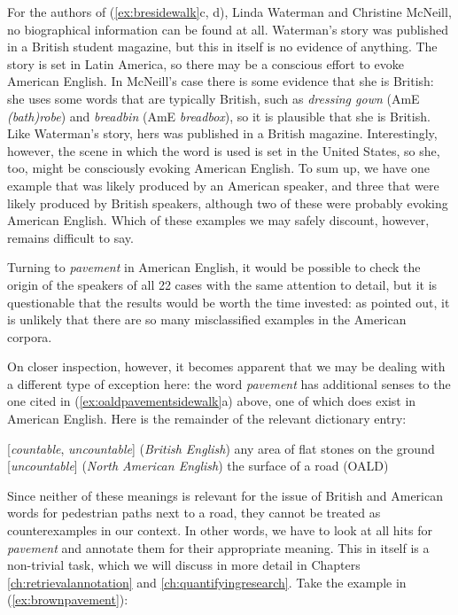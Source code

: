 For the authors of (\ref{ex:bresidewalk}c, d), Linda Waterman and Christine McNeill, no biographical information can be found at all. Waterman's story was published in a British student magazine, but this in itself is no evidence of anything. The story is set in Latin America, so there may be a conscious effort to evoke American English. In McNeill's case there is some evidence that she is British: she uses some words that are typically British, such as \textit{dressing gown} (AmE \textit{(bath)robe}) and \textit{breadbin} (AmE \textit{breadbox}), so it is plausible that she is British. Like Waterman's story, hers was published in a British magazine. Interestingly, however, the scene in which the word is used is set in the United States, so she, too, might be consciously evoking American English. To sum up, we have one example that was likely produced by an American speaker, and three that were likely produced by British speakers, although two of these were probably evoking American English. Which of these examples we may safely discount, however, remains difficult to say.

Turning to \textit{pavement} in American English, it would be possible to check the origin of the speakers of all 22 cases with the same attention to detail, but it is questionable that the results would be worth the time invested: as pointed out, it is unlikely that there are so many misclassified examples in the American corpora.

On closer inspection, however, it becomes apparent that we may be dealing with a different type of exception here: the word \textit{pavement} has additional senses to the one cited in (\ref{ex:oaldpavementsidewalk}a) above, one of which does exist in American English. Here is the remainder of the relevant dictionary entry:

\begin{exe}
\ex
\begin{xlist}
\label{ex:restoaldpavement}
 [\textit{countable}, \textit{uncountable}] (\textit{British English}) any area of flat stones on the ground
 [\textit{uncountable}] (\textit{North American English}) the surface of a road (OALD)
\end{xlist}
\end{exe}

Since neither of these meanings is relevant for the issue of British and American words for pedestrian paths next to a road, they cannot be treated as counterexamples in our context. In other words, we have to look at all hits for \textit{pavement} and annotate them for their appropriate meaning. This in itself is a non-trivial task, which we will discuss in more detail in Chapters \ref{ch:retrievalannotation} and \ref{ch:quantifyingresearch}. Take the example in (\ref{ex:brownpavement}):

